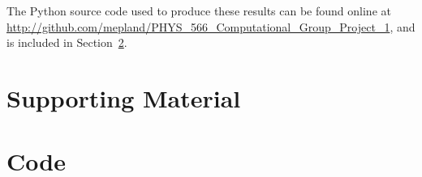\documentclass[notitlepage,aps,prd,nofootinbib]{revtex4-1}
\begin{document}
The Python source code used to produce these results can be found online at \url{http://github.com/mepland/PHYS_566_Computational_Group_Project_1}, and is included in Section~\ref{sec:code}.


\clearpage
\section{Supporting Material}
\label{sec:Supporting_Material}



\clearpage



\clearpage
\section{Code}
\label{sec:code}





\clearpage

\end{document}
